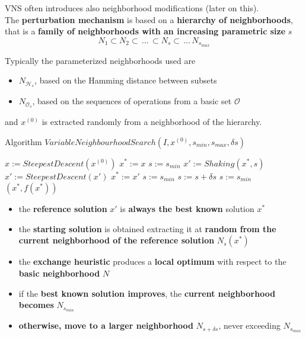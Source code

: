 VNS often introduces also neighborhood modifications (later on this).\\

The \textbf{perturbation mechanism} is based on a \textbf{hierarchy of neighborhoods}, that is a \textbf{family of neighborhoods with an increasing parametric size} $s$
$$ N_1 \subset N_2 \subset \, ... \, \subset N_s \subset \, ... \, N_{s_{max}} $$


Typically the parameterized neighborhoods used are
\begin{itemize}
	\item $N_{\mathcal{H}_s}$, based on the Hamming distance between subsets
	
	\item $N_{\mathcal{O}_s}$, based on the sequences of operations from a basic set $\mathcal{O}$
\end{itemize}

and $x^{(0)}$ is extracted randomly from a neighborhood of the hierarchy.\\

\newpage

\begin{algorithm}
	\caption{Algorithm $VariableNeighbourhoodSearch(I , x^{(0)}, s_{min}, s_{max}, \delta s)$}
	\begin{algorithmic}
		\STATE $x := SteepestDescent(x^{(0)})$ 
		\STATE $x^\ast := x$
		\STATE $s := s_{min}$
		\STATE $x' := Shaking(x^\ast, s)$
		\STATE $x' := SteepestDescent(x')$
		\STATE $x^\ast := x'$
		\STATE $s := s_{min}$
		\ELSE 
		\STATE $s := s + \delta s$
		\ENDIF
		\STATE $s := s_{min}$
		\ENDIF
		\ENDFOR
		\RETURN $(x^\ast, f (x^\ast))$
	\end{algorithmic}
\end{algorithm}

\begin{itemize}
	\item the \textbf{reference solution} $x'$ is \textbf{always the best known} solution $x^\ast$
	
	\item the \textbf{starting solution} is obtained extracting it at \textbf{random from the current neighborhood of the reference solution} $N_s (x^\ast)$
	
	\item the \textbf{exchange heuristic} produces a \textbf{local optimum} with respect to the \textbf{basic neighborhood} $N$
	
	\item if the \textbf{best known solution improves}, the \textbf{current neighborhood becomes} $N_{s_{min}}$
	
	\item \textbf{otherwise, move to a larger neighborhood} $N_{s+\delta s}$, never exceeding $N_{s_{max}}$
\end{itemize}

